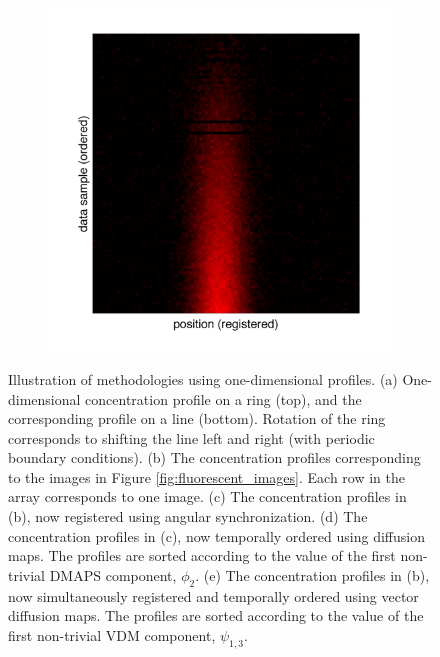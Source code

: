 \documentclass{pnastwo}
\begin{document}
\begin{figure}
\begin{subfigure}{0.2\textwidth}
\caption{}
\label{subfig:1d_aligned_ordered}
\end{subfigure}
\begin{subfigure}{0.2\textwidth}
\includegraphics[width=\textwidth]{registered_ordered_vdm_toy}
\caption{}
\label{subfig:1d_aligned_ordered_vdm}
\end{subfigure}
\caption{Illustration of methodologies using one-dimensional profiles. (a) One-dimensional concentration profile on a ring (top), and the corresponding profile on a line (bottom). Rotation of the ring corresponds to shifting the line left and right (with periodic boundary conditions). (b) The concentration profiles corresponding to the images in Figure \ref{fig:fluorescent_images}. Each row in the array corresponds to one image. (c) The concentration profiles in (b), now registered using angular synchronization. (d) The concentration profiles in (c), now temporally ordered using diffusion maps. The profiles are sorted according to the value of the first non-trivial DMAPS component, $\phi_2$. (e) The concentration profiles in (b), now simultaneously registered and temporally ordered using vector diffusion maps. The profiles are sorted according to the value of the first non-trivial VDM component, $\psi_{1, 3}$.}
\label{fig:1d_demo}
\end{figure}
\end{document}
